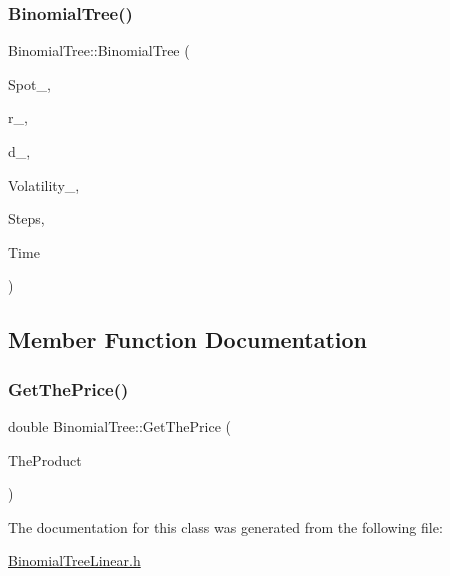 \subsubsection{\texorpdfstring{Binomial\+Tree()}{BinomialTree()}}
{\footnotesize\ttfamily Binomial\+Tree\+::\+Binomial\+Tree (\begin{DoxyParamCaption}\item[{double}]{Spot\+\_\+,  }\item[{const \hyperlink{classParameters}{Parameters} \&}]{r\+\_\+,  }\item[{const \hyperlink{classParameters}{Parameters} \&}]{d\+\_\+,  }\item[{double}]{Volatility\+\_\+,  }\item[{unsigned long}]{Steps,  }\item[{double}]{Time }\end{DoxyParamCaption})}



\subsection{Member Function Documentation}
\hypertarget{classBinomialTree_a07abae93043bcd34d7144913b2290b03}{}\label{classBinomialTree_a07abae93043bcd34d7144913b2290b03} 
\subsubsection{\texorpdfstring{Get\+The\+Price()}{GetThePrice()}}
{\footnotesize\ttfamily double Binomial\+Tree\+::\+Get\+The\+Price (\begin{DoxyParamCaption}\item[{\hyperlink{classTreeProduct}{Tree\+Product} \&}]{The\+Product }\end{DoxyParamCaption})}



The documentation for this class was generated from the following file\+:\begin{DoxyCompactItemize}
\item 
\hyperlink{BinomialTreeLinear_8h}{Binomial\+Tree\+Linear.\+h}\end{DoxyCompactItemize}
